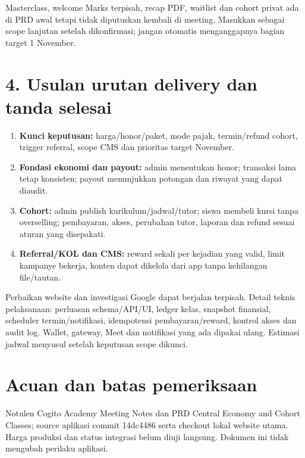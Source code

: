 \documentclass[10pt,a4paper]{article}
\begin{document}
Masterclass, welcome Marks terpisah, recap PDF, waitlist dan cohort privat ada di PRD awal tetapi tidak diputuskan kembali di meeting. Masukkan sebagai scope lanjutan setelah dikonfirmasi; jangan otomatis menganggapnya bagian target 1 November.


\newpage
\section*{4. Usulan urutan delivery dan tanda selesai}

\begin{enumerate}
\item \textbf{Kunci keputusan:} harga/\allowbreak{}honor/\allowbreak{}paket, mode pajak, termin/\allowbreak{}refund cohort, trigger referral, scope CMS dan prioritas target November.
\item \textbf{Fondasi ekonomi dan payout:} admin menentukan honor; transaksi lama tetap konsisten; payout menunjukkan potongan dan riwayat yang dapat diaudit.
\item \textbf{Cohort:} admin publish kurikulum/\allowbreak{}jadwal/\allowbreak{}tutor; siswa membeli kursi tanpa overselling; pembayaran, akses, perubahan tutor, laporan dan refund sesuai aturan yang disepakati.
\item \textbf{Referral/\allowbreak{}KOL dan CMS:} reward sekali per kejadian yang valid, limit kampanye bekerja, konten dapat dikelola dari app tanpa kehilangan file/\allowbreak{}tautan.
\end{enumerate}

Perbaikan website dan investigasi Google dapat berjalan terpisah. Detail teknis pelaksanaan: perluasan schema/\allowbreak{}API/\allowbreak{}UI, ledger kelas, snapshot finansial, scheduler termin/\allowbreak{}notifikasi, idempotensi pembayaran/\allowbreak{}reward, kontrol akses dan audit log. Wallet, gateway, Meet dan notifikasi yang ada dipakai ulang. Estimasi jadwal menyusul setelah keputusan scope dikunci.

\section*{Acuan dan batas pemeriksaan}
Notulen Cogito Academy Meeting Notes dan PRD Central Economy and Cohort Classes; source aplikasi commit 14dc4486 serta checkout lokal website utama. Harga produksi dan status integrasi belum diuji langsung. Dokumen ini tidak mengubah perilaku aplikasi.
\end{document}
